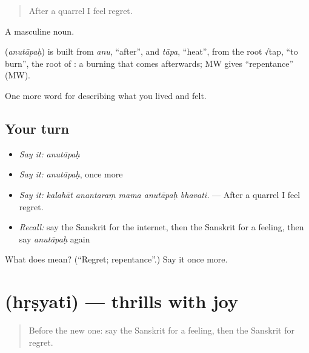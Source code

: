 \begin{quote}
After a quarrel I feel regret.
\end{quote}

A masculine noun.

\begin{cousinweb}
\textbf{} (\emph{anutāpaḥ}) is built from \emph{anu}, \textquotedblleft{}after\textquotedblright{}, and \emph{tāpa}, \textquotedblleft{}heat\textquotedblright{}, from the root √tap, \textquotedblleft{}to burn\textquotedblright{}, the root of \textbf{}: a burning that comes afterwards; MW gives \textquotedblleft{}repentance\textquotedblright{} (MW).
\end{cousinweb}

\begin{grammarlens}[title={What you've built}]
One more word for describing what you lived and felt.
\end{grammarlens}

\subsection*{Your turn}
\begin{itemize}
\raggedright
  \item \emph{Say it:} \emph{anutāpaḥ}
  \item \emph{Say it:} \emph{anutāpaḥ}, once more
  \item \emph{Say it:} \emph{kalahāt anantaraṃ mama anutāpaḥ bhavati.} — After a quarrel I feel regret.
  \item \emph{Recall:} say the Sanskrit for the internet, then the Sanskrit for a feeling, then say \emph{anutāpaḥ} again
\end{itemize}

\begin{tcolorbox}[breakable,colback=teal!4,colframe=teal!35!black,title={Before you move on}]
What does  mean? (\textquotedblleft{}Regret; repentance\textquotedblright{}.) Say it once more.
\end{tcolorbox}
\section[\texorpdfstring{\sk{हृष्यति} (hṛṣyati)}{हृष्यति (hṛṣyati)}]{ (hṛṣyati) — thrills with joy}

\label{lesson:SA-C448-hrsyati}



\begin{quote}
Before the new one: say the Sanskrit for a feeling, then the Sanskrit for regret.
\end{quote}

